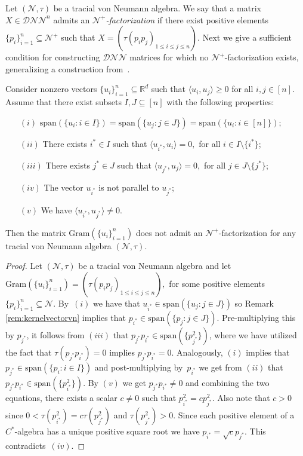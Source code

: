 \documentclass{siamart}
\begin{document}
Let   $(\mathcal{N},\tau)$ be a tracial  von Neumann algebra. We say
that a matrix  $X\in {\mathcal{DNN}}^n$ admits an {\em
$\mathcal{N}^+$-factorization} if   there exist positive elements
$\{p_i\}_{i=1}^n\subseteq \mathcal{N}^+$ such that
$X=(\tau(p_ip_j)_{1\le i \le j\le n}).$ Next we  give a sufficient
condition for constructing ${\mathcal{DNN}}$ matrices for which no
$\mathcal{N}^+$-factorization exists, generalizing a construction
from~\cite{FW}.

\medskip
\begin{theorem}\label{thm:dnnminuscpsd}
Consider  nonzero
vectors $\{u_i\}_{i=1}^n\subseteq {\mathbb{R}}^d$ such that ${\langle} u_i,u_j{\rangle}\ge 0 $ for all $i,j\in [n].$ Assume that there exist  subsets $ I, J\subseteq  [n]$ with the following properties:
\begin{itemize}
\item[$(i)$]  ${\mathrm{span}}({\{u_i: i \in I \}})={\mathrm{span}}({\{u_j: j\in J \}})= {\mathrm{span}}({\{ u_i: i\in [n] \}});$
\item[$(ii)$] There exists $i^*\in I $ such that ${\langle} u_{i^*}, u_i{\rangle} =0, $ for all $i\in I\setminus \{i^*\}$;
\item[$(iii)$] There exists $j^*\in J $ such that ${\langle} u_{j^*}, u_j{\rangle} =0,$ for all $j\in J\setminus \{j^*\}$;
\item[$(iv)$]  The vector $u_{i^*}$ is not parallel to $ u_{j^*}$;
\item[$(v)$]  We have ${\langle} u_{i^*},u_{j^*}{\rangle}\ne 0$.
\end{itemize}
Then the matrix ${\mathrm{Gram}}(\{u_i\}_{i=1}^n)$ does not admit an $\mathcal{N}^+$-factorization  for any tracial  von Neumann algebra $(\mathcal{N},\tau)$.
\end{theorem}
\medskip

\begin{proof}
Let $(\mathcal{N},\tau)$ be a tracial  von Neumann algebra  and    let ${\mathrm{Gram}}(\{u_i\}_{i=1}^n)=(\tau(p_ip_j)_{1\le i
\le j\le n}),$ for some positive elements $\{p_i\}_{i=1}^n\subseteq
\mathcal{N}$.  By~$(i)$  we have that $u_{i^*}\in {\mathrm{span}}( \{u_j: j\in
J\}) $ so   Remark \ref{rem:kernelvectorvn} implies    that
$p_{i^*}\in {\mathrm{span}}( \{p_j: j\in J\}). $ Pre-multiplying  this by
$p_{j^*}$, it follows from  $(iii)$ that $p_{j^*}p_{i^*}\in {\mathrm{span}}(
\{p_{j^*}^2\})$, {where we have utilized the fact that
$\tau(p_{j^*}p_{i^*})=0$ implies $p_{j^*}p_{i^*}=0$}.
Analogously,   $(i)$ implies  that $p_{j^*}\in {\mathrm{span}}(\{p_i: i\in I\}) $ and post-multiplying   by~$p_{i^*}$ we get from $(ii)$ that $p_{j^*}p_{i^*}\in {\mathrm{span}}( \{ p_{i^*}^2\})$.
By $(v)$ we get  $p_{j^*}p_{i^*}\ne 0$ and  combining the two equations,
there exists a  scalar {$c \neq 0$} such that $ p_{i^*}^2=cp_{j^*}^2$.
 {Also note that $c > 0$ since
 $0 < \tau(p_{i^*}^2) = c \tau (p_{j^*}^2)$ and $\tau (p_{j^*}^2) > 0$.}
 Since each positive element of a $C^\ast$-algebra has a unique positive {square} root  we have  $p_{i^*}=\sqrt{c}p_{j^*}.$ This  contradicts~$(iv)$.
 \end{proof}
\medskip
\end{document}
